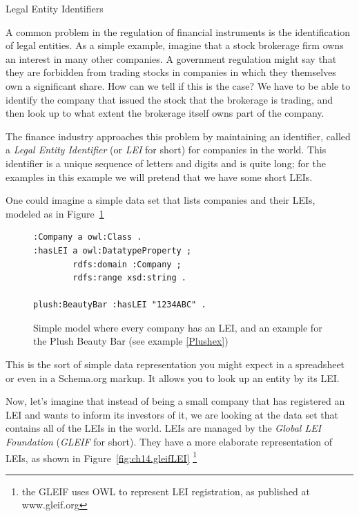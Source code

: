 \begin{challenge}{Legal Entity Identifiers}

A common problem in the regulation of financial instruments 
is the identification of legal entities.  As a simple example, 
imagine that a stock brokerage firm owns an interest in many other 
companies.  A government regulation might say that they are 
forbidden from trading 
stocks in companies in which  they themselves own a significant share.  
How can we tell if this is the case?  We have to be able to 
identify the company that issued the stock that the brokerage 
is trading, and then look up to what extent the brokerage itself
owns part of the company. 

\solution

The finance industry approaches this problem by maintaining an 
identifier, called a \emph{Legal Entity Identifier} (or \emph{LEI} for short)
for companies in the world.  This identifier is a unique sequence of 
letters and digits and is quite long; for the examples in this 
example we will pretend that we have some short LEIs. 

One could imagine a simple data set that lists companies and 
their LEIs, modeled as in Figure~\ref{fig:ch14.simpleLEI}

\begin{figure}
\begin{lstlisting}
:Company a owl:Class .
:hasLEI a owl:DatatypeProperty ;
        rdfs:domain :Company ;
        rdfs:range xsd:string .

plush:BeautyBar :hasLEI "1234ABC" .        
\end{lstlisting}
    \caption{Simple model where every company has an LEI, and an example for the Plush Beauty Bar (see example \ref{Plushex})}
    \label{fig:ch14.simpleLEI}
\end{figure}


This is the sort of simple data representation you might expect 
in a spreadsheet or even in a Schema.org markup.  It allows you 
to look up an entity by its LEI. 

Now, let's imagine that instead of being a small company that  has 
registered an LEI and wants to inform its investors 
of it, we are looking at the data set that contains all of the LEIs in the 
world.  LEIs are managed by the 
\emph{Global LEI Foundation} (\emph{GLEIF} for short).  
They have a more elaborate representation of LEIs, as shown in 
Figure~\ref{fig:ch14.gleifLEI} \cite{GLEIF} \footnote{the GLEIF uses OWL to represent LEI registration, as published at 
www.gleif.org}


\end{challenge}
